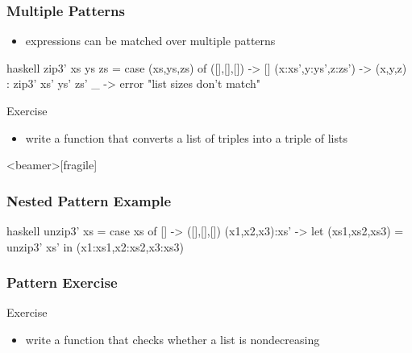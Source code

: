 \documentclass[dvipsnames]{beamer}
\theoremstyle{plain}
\begin{document}
\begin{frame}[fragile]
  \frametitle{Multiple Patterns}

  \begin{itemize}
    \item expressions can be matched over multiple patterns
  \end{itemize}

  \begin{example}
    \pause
    \begin{pygments}{haskell}
zip3' xs ys zs =
    case (xs,ys,zs) of
      ([],[],[]) -> []
      (x:xs',y:ys',z:zs') -> (x,y,z) : zip3' xs' ys' zs'
      _ -> error "list sizes don't match"
    \end{pygments}
  \end{example}

  \pause
  \begin{block}{Exercise}
    \begin{itemize}
      \item write a function that converts a list of triples into a triple of
        lists
    \end{itemize}
  \end{block}
\end{frame}

\begin{frame}<beamer>[fragile]
  \frametitle{Nested Pattern Example}

  \begin{example}
    \begin{pygments}{haskell}
unzip3' xs =
    case xs of
      [] -> ([],[],[])
      (x1,x2,x3):xs' ->
          let
              (xs1,xs2,xs3) = unzip3' xs'
          in
              (x1:xs1,x2:xs2,x3:xs3)
    \end{pygments}
  \end{example}
\end{frame}

\begin{frame}
  \frametitle{Pattern Exercise}

  \begin{block}{Exercise}
    \begin{itemize}
      \item write a function that checks whether a list is nondecreasing
    \end{itemize}
  \end{block}
\end{frame}
\end{document}
